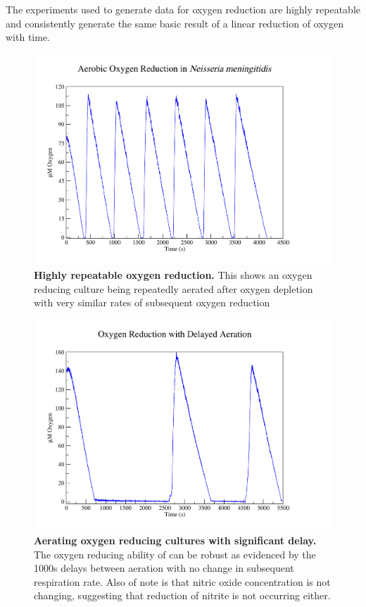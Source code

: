 The experiments used to generate data for oxygen reduction are highly repeatable and consistently generate the same basic result of a linear reduction of oxygen with time.
\begin{figure}[t]
 \centering
 \includegraphics[width=13cm, trim=75px 50px 125px 25px]{./05-oxygenreduction/data/repeatable_o2.pdf}
 \caption[Highly repeatable oxygen reduction]{{\bf Highly repeatable oxygen reduction.} This shows an oxygen reducing culture being repeatedly aerated after oxygen depletion with very similar rates of subsequent oxygen reduction
 \label{fig:oxy_repeatable_chl}}
\end{figure}

\begin{figure}[t]
 \centering
 \includegraphics[width=13cm, trim=75px 50px 125px 25px]{./05-oxygenreduction/data/o2_delay.pdf}
 \caption[Aerating oxygen reducing cultures with significant delay]{{\bf Aerating oxygen reducing cultures with significant delay.} The oxygen reducing ability of \Nm{} can be robust as evidenced by the 1000s delays between aeration with no change in subsequent respiration rate. Also of note is that nitric oxide concentration is not changing, suggesting that reduction of nitrite is not occurring either.
 \label{fig:repeat_oxy_with_delay}}
\end{figure}

